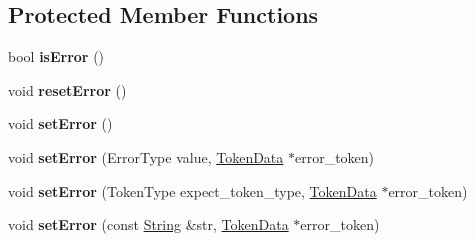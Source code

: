 \subsection*{Protected Member Functions}
\begin{DoxyCompactItemize}
\item 
bool {\bfseries is\+Error} ()\hypertarget{class_object_script_1_1_o_s_1_1_core_1_1_compiler_a90092a5332ae62a6338c3a305e2a67c3}{}\label{class_object_script_1_1_o_s_1_1_core_1_1_compiler_a90092a5332ae62a6338c3a305e2a67c3}

\item 
void {\bfseries reset\+Error} ()\hypertarget{class_object_script_1_1_o_s_1_1_core_1_1_compiler_a042deb93e9a6b6231819116f399880e1}{}\label{class_object_script_1_1_o_s_1_1_core_1_1_compiler_a042deb93e9a6b6231819116f399880e1}

\item 
void {\bfseries set\+Error} ()\hypertarget{class_object_script_1_1_o_s_1_1_core_1_1_compiler_a660f67e41c6f891eac24372fdc81f6b2}{}\label{class_object_script_1_1_o_s_1_1_core_1_1_compiler_a660f67e41c6f891eac24372fdc81f6b2}

\item 
void {\bfseries set\+Error} (Error\+Type value, \hyperlink{class_object_script_1_1_o_s_1_1_core_1_1_tokenizer_1_1_token_data}{Token\+Data} $\ast$error\+\_\+token)\hypertarget{class_object_script_1_1_o_s_1_1_core_1_1_compiler_adffa62b9ea2a57d05576ac5ab0d1e438}{}\label{class_object_script_1_1_o_s_1_1_core_1_1_compiler_adffa62b9ea2a57d05576ac5ab0d1e438}

\item 
void {\bfseries set\+Error} (Token\+Type expect\+\_\+token\+\_\+type, \hyperlink{class_object_script_1_1_o_s_1_1_core_1_1_tokenizer_1_1_token_data}{Token\+Data} $\ast$error\+\_\+token)\hypertarget{class_object_script_1_1_o_s_1_1_core_1_1_compiler_a606077782869b9e1650eba2c37bb6e70}{}\label{class_object_script_1_1_o_s_1_1_core_1_1_compiler_a606077782869b9e1650eba2c37bb6e70}

\item 
void {\bfseries set\+Error} (const \hyperlink{class_object_script_1_1_o_s_1_1_core_1_1_string}{String} \&str, \hyperlink{class_object_script_1_1_o_s_1_1_core_1_1_tokenizer_1_1_token_data}{Token\+Data} $\ast$error\+\_\+token)\hypertarget{class_object_script_1_1_o_s_1_1_core_1_1_compiler_a1c9a5f1e040ae46d6bb1ff258856dc35}{}\label{class_object_script_1_1_o_s_1_1_core_1_1_compiler_a1c9a5f1e040ae46d6bb1ff258856dc35}


\end{DoxyCompactItemize}
